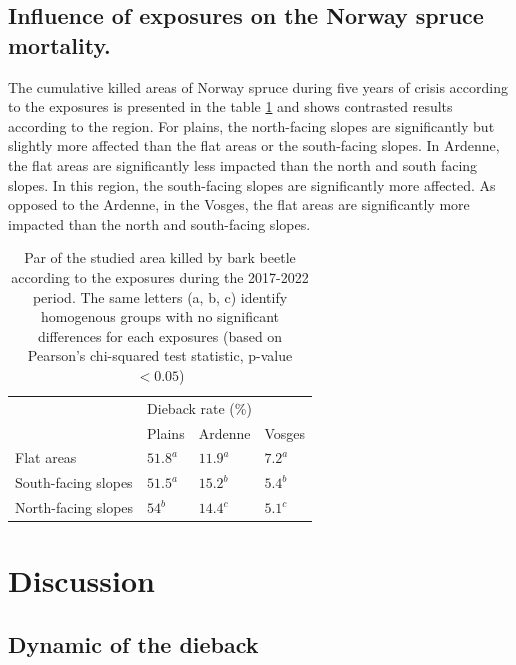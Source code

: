 \documentclass[3p,procedia]{elsarticle}
\begin{document}
\subsection{Influence of  exposures on the Norway spruce mortality.}
The cumulative killed areas of Norway spruce during five years of crisis according to the exposures is presented in the table \ref{tab_or_topo} and shows contrasted results according to the region. 
For plains, the north-facing slopes are significantly but slightly more  affected than the flat areas  or the south-facing slopes.
In Ardenne, the flat areas  are significantly less impacted than the north and south facing slopes. 
In this region, the south-facing slopes are significantly more affected. 
As opposed to the Ardenne, in the Vosges, the flat areas  are significantly more impacted than the north and south-facing slopes.
\begin{table}[htbp]
\caption{Par of the studied area killed by bark beetle according to the exposures during the 2017-2022 period.
The same letters (a, b, c) identify homogenous groups with no significant differences for each exposures  (based on  Pearson's chi-squared test statistic, p-value $< 0.05$)}
\label{tab_or_topo}

\begin{tabular}{|l|lll|}
\hline
\multirow{2}{*}{}  & \multicolumn{3}{l|}{Dieback rate (\%)}                             \\ \cline{2-4} 
                   & \multicolumn{1}{l|}{Plains} & \multicolumn{1}{l|}{Ardenne} & Vosges \\ \hline
Flat areas             & \multicolumn{1}{l|}{$51.8^a$ }    & \multicolumn{1}{l|}{$11.9^a$}    & $7.2^a$   \\ \hline
South-facing slopes & \multicolumn{1}{l|}{$51.5^a$}   & \multicolumn{1}{l|}{$15.2^b$}    & $5.4^b$    \\ \hline
North-facing slopes & \multicolumn{1}{l|}{$54^b$}   & \multicolumn{1}{l|}{$14.4^c$}    & $5.1^c$   \\ \hline
\end{tabular}
\end{table}


\section{Discussion}


   
 
\subsection{Dynamic of the dieback}
\end{document}
